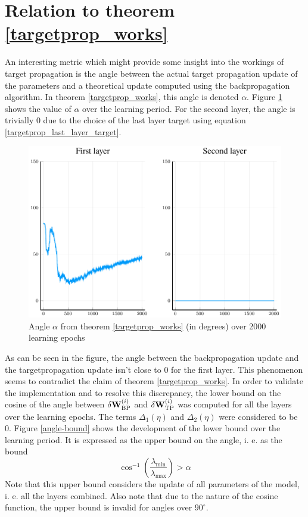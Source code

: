 \section{Relation to theorem \ref{targetprop_works}}

An interesting metric which might provide some insight into the workings of target propagation is the angle between the actual target propagation update of the parameters and a theoretical update computed using the backpropagation algorithm. In theorem \ref{targetprop_works}, this angle is denoted \( \alpha \). Figure \ref{angle} shows the value of \( \alpha \) over the learning period. For the second layer, the angle is trivially 0 due to the choice of the last layer target using equation \ref{targetprop_last_layer_target}.

\begin{figure}
	\centering
	\includegraphics[width=\textwidth]{images/relu-angle/angle.pdf}
	\caption{Angle \( \alpha \) from theorem \ref{targetprop_works} (in degrees) over 2000 learning epochs}\label{angle}
\end{figure}

As can be seen in the figure, the angle between the backpropagation update and the targetpropagation update isn't close to 0 for the first layer. This phenomenon seems to contradict the claim of theorem \ref{targetprop_works}. In order to validate the implementation and to resolve this discrepancy, the lower bound on the cosine of the angle between \( \delta \mathbf{W}_{\mathrm{BP}}^{(i)} \) and \( \delta \mathbf{W}_{\mathrm{TP}}^{(i)} \) was computed for all the layers over the learning epochs. The terms \( \Delta_1 \left( \eta \right) \) and \(  \Delta_2 \left( \eta \right) \) were considered to be 0. Figure \ref{angle-bound} shows the development of the lower bound over the learning period. It is expressed as the upper bound on the angle, i. e. as the bound
\[ \cos^{-1} \left( \frac{\lambda_{\mathrm{min}}}{\lambda_{\mathrm{max}}} \right) > \alpha \]
Note that this upper bound considers the update of all parameters of the model, i. e. all the layers combined. Also note that due to the nature of the cosine function, the upper bound is invalid for angles over \( 90^\circ \).

